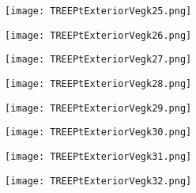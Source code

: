 \documentclass[pdf]{beamer}
\begin{document}
\begin{frame}
\begin{figure}[!h]
\centering
\texttt{[image: TREEPtExteriorVegk25.png]}
\end{figure}
\end{frame}

\begin{frame}
\begin{figure}[!h]
\centering
\texttt{[image: TREEPtExteriorVegk26.png]}
\end{figure}
\end{frame}

\begin{frame}
\begin{figure}[!h]
\centering
\texttt{[image: TREEPtExteriorVegk27.png]}
\end{figure}
\end{frame}

\begin{frame}
\begin{figure}[!h]
\centering
\texttt{[image: TREEPtExteriorVegk28.png]}
\end{figure}
\end{frame}

\begin{frame}
\begin{figure}[!h]
\centering
\texttt{[image: TREEPtExteriorVegk29.png]}
\end{figure}
\end{frame}

\begin{frame}
\begin{figure}[!h]
\centering
\texttt{[image: TREEPtExteriorVegk30.png]}
\end{figure}
\end{frame}

\begin{frame}
\begin{figure}[!h]
\centering
\texttt{[image: TREEPtExteriorVegk31.png]}
\end{figure}
\end{frame}

\begin{frame}
\begin{figure}[!h]
\centering
\texttt{[image: TREEPtExteriorVegk32.png]}
\end{figure}
\end{frame}
\end{document}
